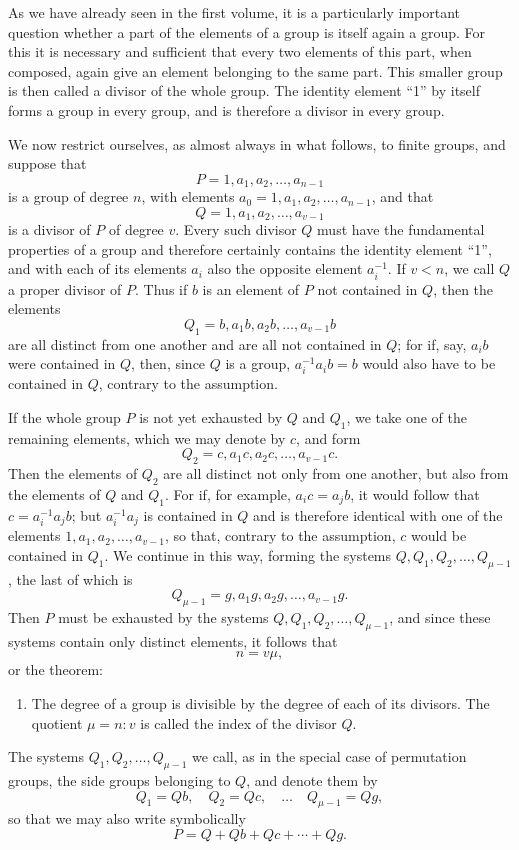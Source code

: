 \documentclass[11pt]{article}
\begin{document}
As we have already seen in the first volume, it is a particularly important question whether a part of the elements of a group is itself again a group. For this it is necessary and sufficient that every two elements of this part, when composed, again give an element belonging to the same part. This smaller group is then called a divisor of the whole group. The identity element ``1'' by itself forms a group in every group, and is therefore a divisor in every group.

We now restrict ourselves, as almost always in what follows, to finite groups, and suppose that
\[
P=1,a_1,a_2,\ldots,a_{n-1}
\]
is a group of degree $n$, with elements $a_0=1,a_1,a_2,\ldots,a_{n-1}$, and that
\[
Q=1,a_1,a_2,\ldots,a_{v-1}
\]
is a divisor of $P$ of degree $v$. Every such divisor $Q$ must have the fundamental properties of a group and therefore certainly contains the identity element ``1'', and with each of its elements $a_i$ also the opposite element $a_i^{-1}$. If $v<n$, we call $Q$ a proper divisor of $P$. Thus if $b$ is an element of $P$ not contained in $Q$, then the elements
\[
Q_1=b,a_1b,a_2b,\ldots,a_{v-1}b
\]
are all distinct from one another and are all not contained in $Q$; for if, say, $a_i b$ were contained in $Q$, then, since $Q$ is a group, $a_i^{-1}a_i b=b$ would also have to be contained in $Q$, contrary to the assumption.

If the whole group $P$ is not yet exhausted by $Q$ and $Q_1$, we take one of the remaining elements, which we may denote by $c$, and form
\[
Q_2=c,a_1c,a_2c,\ldots,a_{v-1}c.
\]
Then the elements of $Q_2$ are all distinct not only from one another, but also from the elements of $Q$ and $Q_1$. For if, for example, $a_i c=a_j b$, it would follow that $c=a_i^{-1}a_jb$; but $a_i^{-1}a_j$ is contained in $Q$ and is therefore identical with one of the elements $1,a_1,a_2,\ldots,a_{v-1}$, so that, contrary to the assumption, $c$ would be contained in $Q_1$. We continue in this way, forming the systems $Q,Q_1,Q_2,\ldots,Q_{\mu-1}$, the last of which is
\[
Q_{\mu-1}=g,a_1g,a_2g,\ldots,a_{v-1}g.
\]
Then $P$ must be exhausted by the systems $Q,Q_1,Q_2,\ldots,Q_{\mu-1}$, and since these systems contain only distinct elements, it follows that
\[
n=v\mu,
\]
or the theorem:
\begin{enumerate}[label=\arabic*.]
\item The degree of a group is divisible by the degree of each of its divisors. The quotient $\mu=n:v$ is called the index of the divisor $Q$.
\end{enumerate}
The systems $Q_1,Q_2,\ldots,Q_{\mu-1}$ we call, as in the special case of permutation groups, the side groups belonging to $Q$, and denote them by
\[
Q_1=Qb,
\quad Q_2=Qc,
\quad\ldots\quad
Q_{\mu-1}=Qg,
\]
so that we may also write symbolically
\begin{equation}
P=Q+Qb+Qc+\cdots+Qg.
\tag{1}
\end{equation}
\end{document}
